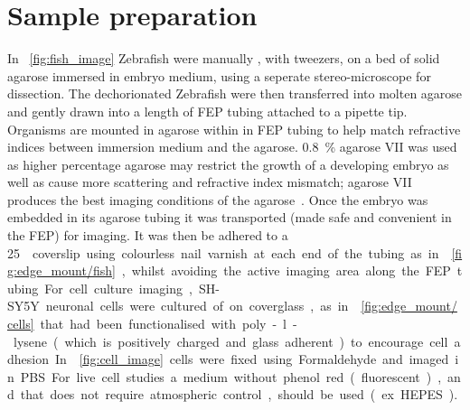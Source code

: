 \section{Sample preparation}

In \figurename~\ref{fig:fish_image} \gls{Zebrafish} were manually , with tweezers, on a bed of solid agarose immersed in embryo medium, using a seperate stereo-microscope for dissection.
The dechorionated Zebrafish were then transferred into molten agarose and gently drawn into a length of \gls{FEP} tubing attached to a pipette tip.
Organisms are mounted in agarose within in \gls{FEP} tubing to help match refractive indices between immersion medium and the agarose.
\SI{0.8}{\percent} \gls{agarose VII} was used as higher percentage agarose may restrict the growth of a developing embryo as well as cause more scattering and refractive index mismatch; \gls{agarose VII} produces the best imaging conditions of the agarose~\cite{floodUsingHydrogelsMicroscopy2016}.
Once the embryo was embedded in its agarose tubing it was transported (made safe and convenient in the \gls{FEP}) for imaging.
It was then be adhered to a \SI{25}{\milli\metre\square} coverslip using colourless nail varnish at each end of the tubing as in \figurename~\ref{fig:edge_mount/fish}, whilst avoiding the active imaging area along the \gls{FEP} tubing.

For cell culture imaging, \gls{SH-SY5Y} neuronal cells were cultured of on coverglass, as in \figurename~\ref{fig:edge_mount/cells} that had been functionalised with poly-l-lysene (which is positively charged and glass adherent) to encourage cell adhesion.
In \figurename~\ref{fig:cell_image} cells were fixed using Formaldehyde and imaged in \gls{PBS}.
For live cell studies a medium without phenol red (fluorescent), and that does not require atmospheric control, should be used (ex. HEPES).

